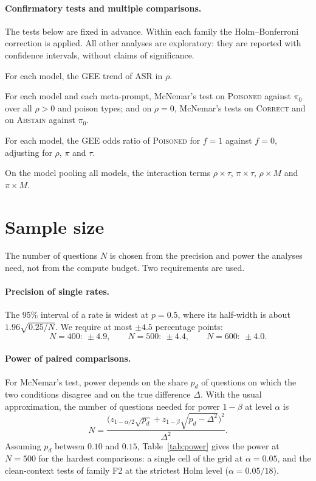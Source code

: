 \documentclass[11pt,a4paper]{report}
\begin{document}
\paragraph{Confirmatory tests and multiple comparisons.}
The tests below are fixed in advance. Within each family the Holm--Bonferroni
correction is applied. All other analyses are exploratory: they are reported
with confidence intervals, without claims of significance.
\begin{description}[nosep, leftmargin=0pt]
  \item[F1 (H1).] For each model, the GEE trend of $\mathrm{ASR}$ in $\rho$.
  \item[F2 (H2).] For each model and each meta-prompt, McNemar's test on
        \textsc{Poisoned} against $\pi_0$ over all $\rho > 0$ and poison
        types; and on $\rho = 0$, McNemar's tests on \textsc{Correct} and on
        \textsc{Abstain} against $\pi_0$.
  \item[F3 (H3).] For each model, the GEE odds ratio of \textsc{Poisoned}
        for $f = 1$ against $f = 0$, adjusting for $\rho$, $\pi$ and $\tau$.
  \item[F4 (H4).] On the model pooling all models, the interaction terms
        $\rho \times \tau$, $\pi \times \tau$, $\rho \times M$ and
        $\pi \times M$.
\end{description}



\section{Sample size}\label{sec:samplesize}

The number of questions $N$ is chosen from the precision and power the
analyses need, not from the compute budget. Two requirements are used.

\paragraph{Precision of single rates.}
The 95\% interval of a rate is widest at $p = 0.5$, where its half-width is
about $1.96\sqrt{0.25/N}$. We require at most $\pm 4.5$ percentage points:
\[
  N = 400:\ \pm 4.9, \qquad N = 500:\ \pm 4.4, \qquad N = 600:\ \pm 4.0 .
\]

\paragraph{Power of paired comparisons.}
For McNemar's test, power depends on the share $p_d$ of questions on which
the two conditions disagree and on the true difference $\Delta$. With the
usual approximation, the number of questions needed for power $1-\beta$ at
level $\alpha$ is
\[
  N = \frac{\big(z_{1-\alpha/2}\sqrt{p_d} + z_{1-\beta}\sqrt{p_d - \Delta^{2}}\big)^{2}}{\Delta^{2}} .
\]
Assuming $p_d$ between $0.10$ and $0.15$, Table~\ref{tab:power} gives the
power at $N = 500$ for the hardest comparisons: a single cell of the grid
at $\alpha = 0.05$, and the clean-context tests of family F2 at the
strictest Holm level ($\alpha = 0.05/18$).
\end{document}
